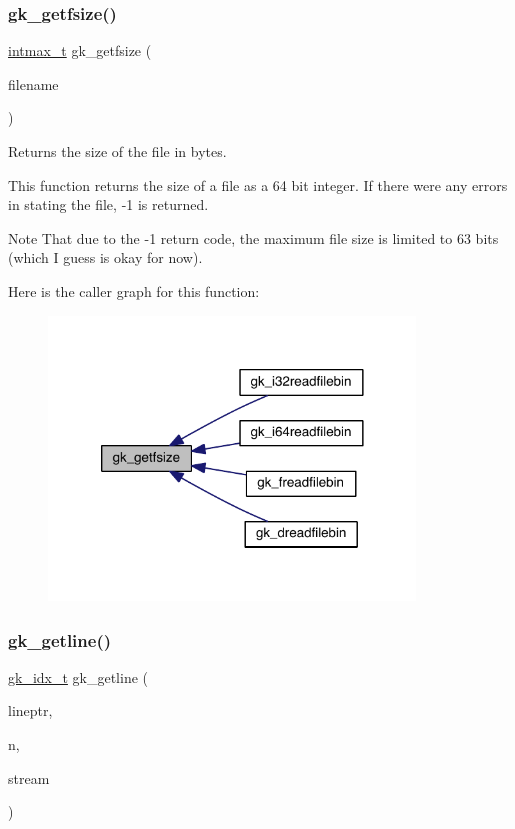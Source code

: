 \subsubsection{\texorpdfstring{gk\+\_\+getfsize()}{gk\_getfsize()}}
{\footnotesize\ttfamily \hyperlink{a00119_a036cd61bb4b30bb510b9538af4cebd1d}{intmax\+\_\+t} gk\+\_\+getfsize (\begin{DoxyParamCaption}\item[{char $\ast$}]{filename }\end{DoxyParamCaption})}



Returns the size of the file in bytes. 

This function returns the size of a file as a 64 bit integer. If there were any errors in stat\textquotesingle{}ing the file, -\/1 is returned. \begin{DoxyNote}{Note}
That due to the -\/1 return code, the maximum file size is limited to 63 bits (which I guess is okay for now). 
\end{DoxyNote}
Here is the caller graph for this function\+:\nopagebreak
\begin{figure}[H]
\begin{center}
\leavevmode
\includegraphics[width=276pt]{a00077_a2df84c581bac9b89dbfcca4767bdcc36_icgraph}
\end{center}
\end{figure}
\mbox{\label{a00077_ad8263f64108434d7ebab9799b5ab9632}} 
\subsubsection{\texorpdfstring{gk\+\_\+getline()}{gk\_getline()}}
{\footnotesize\ttfamily \hyperlink{a00083_a899f9d8c47b1ca0c2fead41097f4bde2}{gk\+\_\+idx\+\_\+t} gk\+\_\+getline (\begin{DoxyParamCaption}\item[{char $\ast$$\ast$}]{lineptr,  }\item[{size\+\_\+t $\ast$}]{n,  }\item[{F\+I\+LE $\ast$}]{stream }\end{DoxyParamCaption})}

